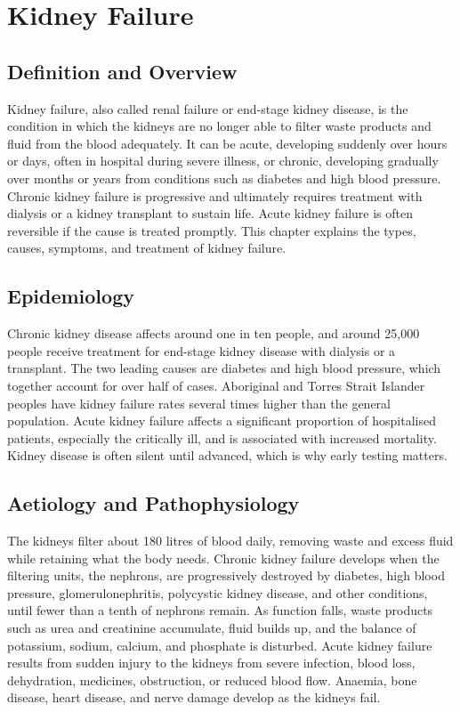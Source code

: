 \chapter{Kidney Failure}

\section*{Definition and Overview}
Kidney failure, also called renal failure or end-stage kidney disease, is the condition in which the kidneys are no longer able to filter waste products and fluid from the blood adequately. It can be acute, developing suddenly over hours or days, often in hospital during severe illness, or chronic, developing gradually over months or years from conditions such as diabetes and high blood pressure. Chronic kidney failure is progressive and ultimately requires treatment with dialysis or a kidney transplant to sustain life. Acute kidney failure is often reversible if the cause is treated promptly. This chapter explains the types, causes, symptoms, and treatment of kidney failure.

\section*{Epidemiology}
Chronic kidney disease affects around one in ten people, and around 25,000 people receive treatment for end-stage kidney disease with dialysis or a transplant. The two leading causes are diabetes and high blood pressure, which together account for over half of cases. Aboriginal and Torres Strait Islander peoples have kidney failure rates several times higher than the general population. Acute kidney failure affects a significant proportion of hospitalised patients, especially the critically ill, and is associated with increased mortality. Kidney disease is often silent until advanced, which is why early testing matters.

\section*{Aetiology and Pathophysiology}
The kidneys filter about 180 litres of blood daily, removing waste and excess fluid while retaining what the body needs. Chronic kidney failure develops when the filtering units, the nephrons, are progressively destroyed by diabetes, high blood pressure, glomerulonephritis, polycystic kidney disease, and other conditions, until fewer than a tenth of nephrons remain. As function falls, waste products such as urea and creatinine accumulate, fluid builds up, and the balance of potassium, sodium, calcium, and phosphate is disturbed. Acute kidney failure results from sudden injury to the kidneys from severe infection, blood loss, dehydration, medicines, obstruction, or reduced blood flow. Anaemia, bone disease, heart disease, and nerve damage develop as the kidneys fail.

